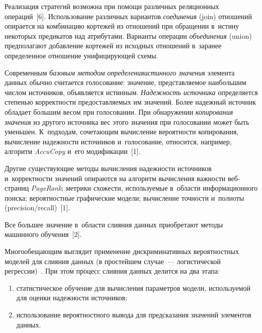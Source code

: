 \begin{multicols}{2}
    Реализация стратегий возможна при помощи различных реляционных 
операций~[6]. Использование различных вариантов \textit{соединения} (join) 
отношений опирается на комбинацию кортежей из отношений при 
обращении в~истину некоторых предикатов над атрибутами. Варианты 
операции \textit{объединения} (union) предполагают добавление кортежей из 
исходных отношений в~заранее определенное отношение унифицирующей 
схемы. 
    
    Современным \textit{базовым методом определения\linebreak истинного 
значения} элемента данных обыч\-но считается голосование: значение, 
представ\-ля\-емое наибольшим чис\-лом источников, объявляется \mbox{истинным}. 
\textit{Надежность источника} определяется сте\-пенью кор\-рект\-ности 
предостав\-ля\-емых им значений. Более надежный источник обладает 
б$\acute{\mbox{о}}$льшим весом при голосовании. При обнаружении 
\textit{копирования значения} из другого источника вес этого значения при 
голосовании может быть уменьшен. К~подходам, сочетающим вы\-чис\-ле\-ние 
ве\-ро\-ят\-ности копирования, вы\-чис\-ле\-ние на\-деж\-ности источников 
и~голосование, относится, например, алгоритм \mbox{\textit{AccuCopy}} и~его 
модификации~[1]. 
    
    Другие существующие методы вычисления надежности источников и~корректности значений\linebreak
     опираются на алгоритм вычисления важности  
веб-стра\-ниц \textit{PageRank}; метрики схожести, ис\-поль\-зу\-емые в~об\-ласти 
информационного поиска; вероятностные графические модели; вы\-чис\-ле\-ние 
\mbox{точ\-ности} и~пол\-но\-ты (precision/recall)~[1].
    
    Все большее значение в~области слияния данных приобретают методы 
машинного обучения~[2]. 
    
    Многообещающим выглядит применение дискриминативных 
вероятностных моделей для слияния данных (в простейшем случае~--- 
логистической регрессии)~\cite{7-ste}. При этом процесс слияния данных 
делится на два этапа:
    \begin{enumerate}[(1)]
\item статистическое обучение для вычисления параметров модели, 
используемой для оценки надежности источников;
\item использование вероятностного вывода для предсказания значений 
элементов данных.
\end{enumerate}
    

\end{multicols}
